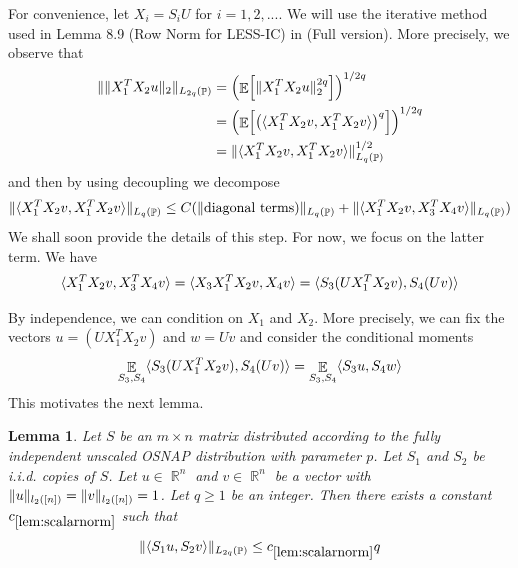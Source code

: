 \documentclass[11pt]{amsart}
\numberwithin{equation}{section}
\numberwithin{equation}{section}
\DeclareMathOperator{\E}{\mathbb{E}}
\DeclareMathOperator{\R}{\mathbb{R}}
\DeclareMathOperator{\Pb}{\mathbb{P}}
\DeclarePairedDelimiter{\norm}{\lVert}{\rVert}
\DeclarePairedDelimiter{\ip}{\langle}{\rangle}
\DeclarePairedDelimiter{\paren}{(}{)}
\DeclarePairedDelimiter{\sqbr}{[}{]}
\newtheorem{lemma}[theorem]{Lemma}
\begin{document}
For convenience, let $X_i=S_iU$ for $i=1,2,...$. We will use the iterative method used in 
Lemma 8.9 (Row Norm for LESS-IC) in \cite{chenakkod2025optimal}(Full version). More precisely, we observe that
\begin{align*}
    \norm{\norm{X_1^TX_2u}_2}_{L_{2q}(\Pb)} &= \paren*{ \E \sqbr*{ \norm{X_1^TX_2u}_2^{2q} } }^{1/2q} \\ 
    &= \paren*{ \E \sqbr*{ \paren*{\ip{X_1^TX_2v,X_1^TX_2v}}^{q} } }^{1/2q}\\
    &= \norm{\ip{X_1^TX_2v,X_1^TX_2v}}_{L_{q}(\Pb)}^{1/2}
\end{align*}
and then by using decoupling we decompose
\begin{align} \label{eq:vecdecoup}
    \norm{\ip{X_1^TX_2v,X_1^TX_2v}}_{L_{q}(\Pb)} \le C(\norm{\text{diagonal terms})}_{L_{q}(\Pb)}+\norm{\ip{X_1^TX_2v,X_3^TX_4v}}_{L_{q}(\Pb)})
\end{align}
We shall soon provide the details of this step. For now, we focus on the latter term. We have
\begin{align*}
    \ip{X_1^TX_2v,X_3^TX_4v}=\ip{X_3X_1^TX_2v,X_4v}=\ip{S_3(UX_1^TX_2v),S_4(Uv)}
\end{align*}

By independence, we can condition on $X_1$ and $X_2$. More precisely, we can fix the vectors $u=(UX_1^TX_2v)$ and $w=Uv$ and consider the conditional moments
\begin{align*}
    \E_{S_3,S_4}\ip{S_3(UX_1^TX_2v),S_4(Uv)}=\E_{S_3,S_4}\ip{S_3u,S_4w}
\end{align*}
This motivates the next lemma.


\begin{lemma}\label{lem:scalarnorm}
Let $S$ be an $m \times n$ matrix distributed according to the fully independent unscaled OSNAP distribution with parameter $p$. Let $S_1$ and $S_2$ be i.i.d. copies of $S$. Let $u \in \R^n$ and $v \in \R^n$ be a vector with $\norm{u}_{l_2([n])}=\norm{v}_{l_2([n])}=1$. Let $q \ge 1$ be an integer. Then there exists a constant $c_{\ref{lem:scalarnorm}}$ such that
\begin{align*}
    \norm{\ip{S_1u,S_2v}}_{L_{2q}(\Pb)} \le c_{\ref{lem:scalarnorm}}q
\end{align*}
\end{lemma}
\end{document}
